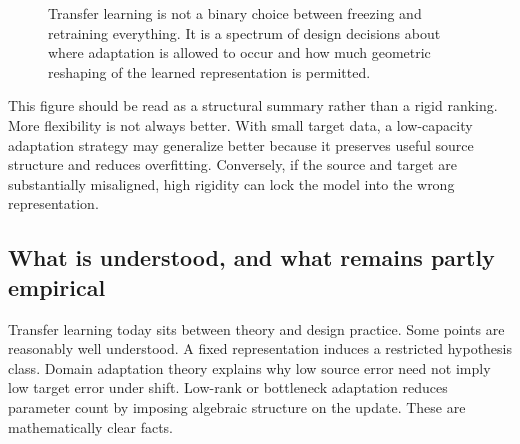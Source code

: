 \begin{figure}[h]
\centering
{}
\caption{Transfer learning is not a binary choice between freezing and retraining everything.
It is a spectrum of design decisions about where adaptation is allowed to occur and how much geometric reshaping of the learned representation is permitted.}
\end{figure}

This figure should be read as a structural summary rather than a rigid ranking.
More flexibility is not always better.
With small target data, a low-capacity adaptation strategy may generalize better because it preserves useful source structure and reduces overfitting.
Conversely, if the source and target are substantially misaligned, high rigidity can lock the model into the wrong representation.

\subsection*{What is understood, and what remains partly empirical}

Transfer learning today sits between theory and design practice.
Some points are reasonably well understood.
A fixed representation induces a restricted hypothesis class.
Domain adaptation theory explains why low source error need not imply low target error under shift.
Low-rank or bottleneck adaptation reduces parameter count by imposing algebraic structure on the update.
These are mathematically clear facts.

